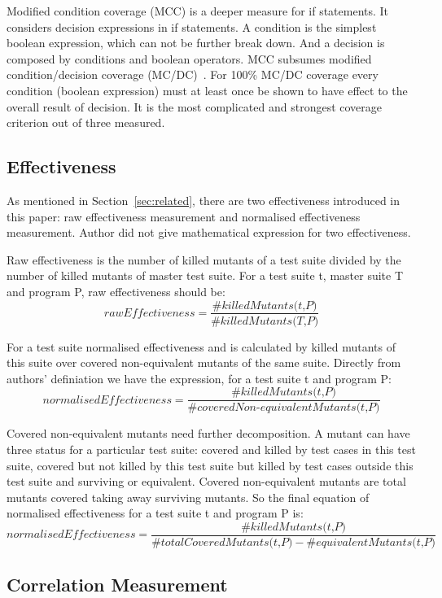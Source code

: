 Modified condition coverage (MCC) is a deeper measure for if statements. It considers decision expressions in if statements. A condition is the simplest boolean expression, which can not be further break down. And a decision is composed by conditions and boolean operators. MCC subsumes modified condition/decision coverage (MC/DC)~\cite{hayhurst2001practical}. For 100\% MC/DC coverage every condition (boolean expression) must at least once be shown to have effect to the overall result of decision. It is the most complicated and strongest coverage criterion out of three measured.

\subsection{Effectiveness}
As mentioned in Section~\ref{sec:related}, there are two effectiveness introduced in this paper: raw effectiveness measurement and normalised effectiveness measurement. Author did not give mathematical expression for two effectiveness.

Raw effectiveness is the number of killed mutants of a test suite divided by the number of killed mutants of master test suite. For a test suite t, master suite T and program P, raw effectiveness should be:
\[\textit{rawEffectiveness} = \frac{\#\textit{killedMutants(t,P)}}{\#\textit{killedMutants(T,P)}}\]

For a test suite normalised effectiveness and is calculated by killed mutants of this suite over covered non-equivalent mutants of the same suite. Directly from authors' definiation we have the expression, for a test suite t and program P:
\[\textit{normalisedEffectiveness} = \frac{\#\textit{killedMutants(t,P)}}{\#\textit{coveredNon-equivalentMutants(t,P)}}\]

Covered non-equivalent mutants need further decomposition. A mutant can have three status for a particular test suite: covered and killed by test cases in this test suite, covered but not killed by this test suite but killed by test cases outside this test suite and surviving or equivalent. Covered non-equivalent mutants are total mutants covered taking away surviving mutants. So the final equation of normalised effectiveness for a test suite t and program P is:
\[\textit{normalisedEffectiveness} = \frac{\#\textit{killedMutants(t,P)}}{\#\textit{totalCoveredMutants(t,P)} - \#\textit{equivalentMutants(t,P)}}\]
\subsection{Correlation Measurement}